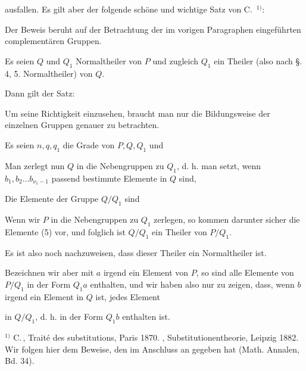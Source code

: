 ausfallen. Es gilt aber der folgende schöne und wichtige Satz
von C.\, $^{1)}$:


Der Beweis beruht auf der Betrachtung der im vorigen
Paragraphen eingeführten complementären Gruppen.

Es seien $Q$ und $Q_1$ Normaltheiler von $P$ und zugleich $Q_1$
ein Theiler (also nach \S.\,4, 5. Normaltheiler) von $Q$.

Dann gilt der Satz:


Um seine Richtigkeit einzusehen, braucht man nur die
Bildungsweise der einzelnen Gruppen genauer zu betrachten.

Es seien $n, q, q_1$ die Grade von $P, Q, Q_1$ und


Man zerlegt nun $Q$ in die Nebengruppen zu $Q_1$, d. h. man
setzt, wenn $b_1, b_2 \ldots b_{\nu_1 - 1}$ passend bestimmte Elemente in $Q$ sind,


Die Elemente der Gruppe $Q/Q_1$ sind


Wenn wir $P$ in die Nebengruppen zu $Q_1$ zerlegen, so kommen
 darunter sicher die Elemente (5) vor, und folglich ist $Q/Q_1$
ein Theiler von $P/Q_1$.

Es ist also noch nachzuweisen, dass dieser Theiler ein
Normaltheiler ist.

Bezeichnen wir aber mit $a$ irgend ein Element von $P$, so
sind alle Elemente von $P/Q_1$ in der Form $Q_1 a$ enthalten, und
wir haben also nur zu zeigen, dass, wenn $b$ irgend ein Element
in $Q$ ist, jedes Element


in $Q/Q_1$, d. h. in der Form $Q_1 b$ enthalten ist.

$^{1)}$ C.\,, Traité des substitutions, Paris 1870. , Substitutionentheorie,
Leipzig 1882. Wir folgen hier dem Beweise, den
 im Anschluss an  gegeben hat (Math. Annalen, Bd. 34).

